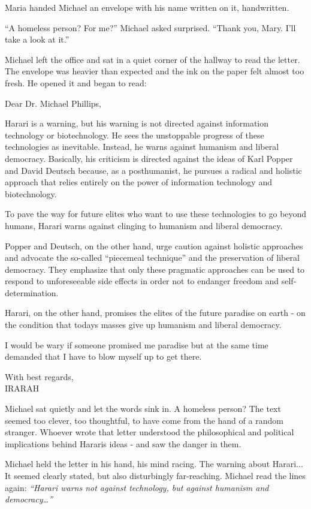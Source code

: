 \documentclass[
]{article}
\begin{document}
Maria handed Michael an envelope with his name written on it,
handwritten.

``A homeless person? For me?'' Michael asked surprised. ``Thank you,
Mary. I'll take a look at it.''

Michael left the office and sat in a quiet corner of the hallway to read
the letter. The envelope was heavier than expected and the ink on the
paper felt almost too fresh. He opened it and began to read:

Dear Dr. Michael Phillips,

Harari is a warning, but his warning is not directed against information
technology or biotechnology. He sees the unstoppable progress of these
technologies as inevitable. Instead, he warns against humanism and
liberal democracy. Basically, his criticism is directed against the
ideas of Karl Popper and David Deutsch because, as a posthumanist, he
pursues a radical and holistic approach that relies entirely on the
power of information technology and biotechnology.

To pave the way for future elites who want to use these technologies to
go beyond humans, Harari warns against clinging to humanism and liberal
democracy.

Popper and Deutsch, on the other hand, urge caution against holistic
approaches and advocate the so-called ``piecemeal technique'' and the
preservation of liberal democracy. They emphasize that only these
pragmatic approaches can be used to respond to unforeseeable side
effects in order not to endanger freedom and self-determination.

Harari, on the other hand, promises the elites of the future paradise on
earth - on the condition that today\textquotesingle s masses give up
humanism and liberal democracy.

I would be wary if someone promised me paradise but at the same time
demanded that I have to blow myself up to get there.

With best regards,\\
IRARAH

Michael sat quietly and let the words sink in. A homeless person? The
text seemed too clever, too thoughtful, to have come from the hand of a
random stranger. Whoever wrote that letter understood the philosophical
and political implications behind Harari\textquotesingle s ideas - and
saw the danger in them.

Michael held the letter in his hand, his mind racing. The warning about
Harari... It seemed clearly stated, but also disturbingly far-reaching.
Michael read the lines again: \emph{``Harari warns not against
technology, but against humanism and democracy\ldots''}
\end{document}
